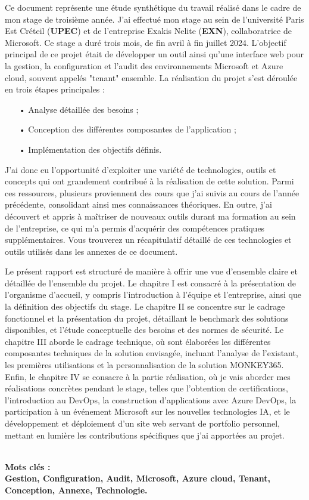 Ce document représente une étude synthétique du travail réalisé dans le
cadre de mon stage de troisième année. J'ai effectué mon stage au sein de
l'université Paris Est Créteil (\textbf{UPEC})  et de l'entreprise Exakis Nelite (\textbf{EXN}), collaboratrice de Microsoft. Ce stage a duré trois mois, de fin avril à fin juillet 2024. L'objectif principal de ce projet était de développer un outil ainsi qu'une interface web pour la gestion, la configuration et l'audit des environnements Microsoft et Azure cloud, souvent appelés "tenant" ensemble. La réalisation du projet s'est déroulée en trois étapes principales :
\begin{itemize}
	\item[•] Analyse détaillée des besoins ;
	\item[•] Conception des différentes composantes de l'application ;
	\item[•] Implémentation des objectifs définis.
\end{itemize}

J'ai donc eu l'opportunité d'exploiter une variété de technologies, outils et concepts qui ont grandement contribué à la réalisation de cette solution. Parmi ces ressources, plusieurs proviennent des cours que j'ai suivis au cours de l'année précédente, consolidant ainsi mes connaissances théoriques. En outre, j'ai découvert et appris à maîtriser de nouveaux outils durant ma formation au sein de l'entreprise, ce qui m'a permis d'acquérir des compétences pratiques supplémentaires. Vous trouverez un récapitulatif détaillé de ces technologies et outils utilisés dans les annexes de ce document.

Le présent rapport est structuré de manière à offrir une vue d'ensemble claire et détaillée de l'ensemble du projet. Le chapitre I est consacré à la présentation de l'organisme d'accueil, y compris l’introduction à l’équipe et l’entreprise, ainsi que la définition des objectifs du stage. Le chapitre II se concentre sur le cadrage fonctionnel et la présentation du projet, détaillant le benchmark des solutions disponibles, et l'étude conceptuelle des besoins et des normes de sécurité. Le chapitre III aborde le cadrage technique, où sont élaborées les différentes composantes techniques de la solution envisagée, incluant l'analyse de l'existant, les premières utilisations et la personnalisation de la solution MONKEY365. Enfin, le chapitre IV se consacre à la partie réalisation, où je vais aborder mes réalisations concrètes pendant le stage, telles que l'obtention de certifications, l'introduction au DevOps, la construction d'applications avec Azure DevOps, la participation à un événement Microsoft sur les nouvelles technologies IA, et le développement et déploiement d'un site web servant de portfolio personnel, mettant en lumière les contributions spécifiques que j'ai apportées au projet.

\textbf	{\\Mots clés :\\ Gestion, Configuration, Audit, Microsoft, Azure cloud, Tenant, Conception, Annexe,  Technologie.}

